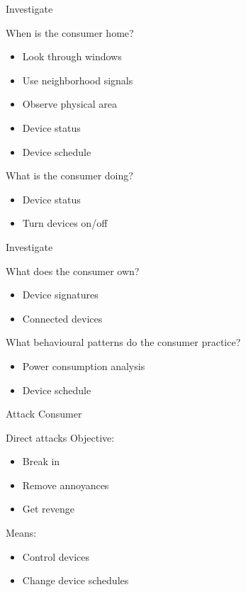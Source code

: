 \begin{frame}{Investigate}
  \begin{block} {When is the consumer home?}
      \begin{itemize}
        \item Look through windows
        \item Use neighborhood signals
        \item Observe physical area
        \item Device status
        \item Device schedule
      \end{itemize}
  \end{block}

  \begin{block}{What is the consumer doing?}
    \begin{itemize}
      \item Device status
      \item Turn devices on/off
    \end{itemize}
\end{block}
\end{frame}

\begin{frame}{Investigate}
    \begin{block}{What does the consumer own?}
    \begin{itemize}
      \item Device signatures
      \item Connected devices
    \end{itemize}
  \end{block}

  \begin{block}{What behavioural patterns do the consumer practice?}
    \begin{itemize}
      \item Power consumption analysis
      \item Device schedule
    \end{itemize}
  \end{block}
\end{frame}

\begin{frame}{Attack Consumer}
    \begin{block}{Direct attacks}
      Objective:
      \begin{itemize}
        \item Break in
        \item Remove annoyances
        \item Get revenge
      \end{itemize}
      Means:
      \begin{itemize}
        \item Control devices
        \item Change device schedules
      \end{itemize}
    \end{block}
\end{frame}


